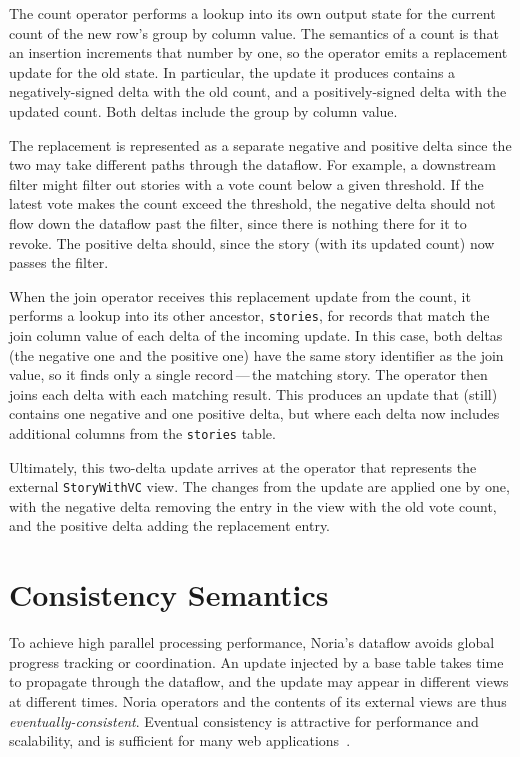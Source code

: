 The count operator performs a lookup into its own output state for the current
count of the new row's group by column value. The semantics of a count is that
an insertion increments that number by one, so the operator emits a replacement
update for the old state. In particular, the update it produces contains a
negatively-signed delta with the old count, and a positively-signed delta with
the updated count. Both deltas include the group by column value.

The replacement is represented as a separate negative and positive delta since
the two may take different paths through the dataflow. For example, a downstream
filter might filter out stories with a vote count below a given threshold. If
the latest vote makes the count exceed the threshold, the negative delta should
not flow down the dataflow past the filter, since there is nothing there for it
to revoke. The positive delta should, since the story (with its updated count)
now passes the filter.

When the join operator receives this replacement update from the count, it
performs a lookup into its other ancestor, \texttt{stories}, for records that
match the join column value of each delta of the incoming update. In this case,
both deltas (the negative one and the positive one) have the same story
identifier as the join value, so it finds only a single record\,---\,the
matching story. The operator then joins each delta with each matching result.
This produces an update that (still) contains one negative and one positive
delta, but where each delta now includes additional columns from the
\texttt{stories} table.

Ultimately, this two-delta update arrives at the operator that represents the
external \texttt{StoryWithVC} view. The changes from the update are applied one
by one, with the negative delta removing the entry in the view with the old vote
count, and the positive delta adding the replacement entry.

\section{Consistency Semantics}
\label{s:noria:consistency}

To achieve high parallel processing performance, Noria's dataflow avoids
global progress tracking or coordination. An update injected by a base table
takes time to propagate through the dataflow, and the update may appear in
different views at different times. Noria operators and the contents of its
external views are thus \emph{eventually-consistent}. Eventual consistency is
attractive for performance and scalability, and is sufficient for many web
applications~\cite{eventually-consistent, facebook-memcache, pnuts}.

